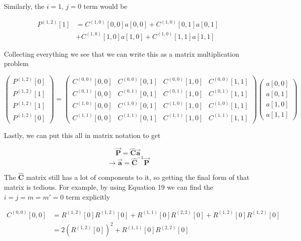 \documentclass{article}
\begin{document}
Similarly, the $i=1,\, j=0$ term would be

\begin{align}
    P^{(1,2)}[1] &= C^{(1,0)}[0,0] a[0,0] + C^{(1,0)}[0,1] a[0,1]\nonumber\\
    &+ C^{(1,0)}[1,0] a[1,0] + C^{(1,0)}[1,1] a[1,1]
\end{align}

Collecting everything we see that we can write this as a matrix multiplication
problem

\begin{equation}
    \begin{pmatrix}
        P^{(1,2)}[0]\\
        P^{(1,2)}[1]\\
        P^{(1,2)}[1]\\
        P^{(1,2)}[0]
    \end{pmatrix}
    =
    \begin{pmatrix}
        C^{(0,0)}[0,0] & C^{(0,0)}[0,1] & C^{(0,0)}[1,0] & C^{(0,0)}[1,1]\\
        C^{(0,1)}[0,0] & C^{(0,1)}[0,1] & C^{(0,1)}[1,0] & C^{(0,1)}[1,1]\\
        C^{(1,0)}[0,0] & C^{(1,0)}[0,1] & C^{(1,0)}[1,0] & C^{(1,0)}[1,1]\\
        C^{(1,1)}[0,0] & C^{(1,1)}[0,1] & C^{(1,1)}[1,0] & C^{(1,1)}[1,1]
    \end{pmatrix}
    \begin{pmatrix}
        a[0,0]\\
        a[0,1]\\
        a[1,0]\\
        a[1,1]
    \end{pmatrix}
\end{equation}

Lastly, we can put this all in matrix notation to get

\begin{equation}
    \vec{\mathbf{P}} = \hat{\mathbf{C}} \vec{\mathbf{a}}\nonumber
\end{equation}
\begin{equation}
    \to \vec{\mathbf{a}} = \hat{\mathbf{C}}^{-1}\vec{\mathbf{P}}
\end{equation}

The $\hat{\mathbf{C}}$ matrix still has a lot of components to it, so getting
the final form of that matrix is tedious. For example, by using Equation 19
we can find the $i=j=m=m'=0$ term explicitly

\begin{align}
    C^{(0,0)}[0,0] &= R^{(1,2)}[0]R^{(1,2)}[0] + R^{(1,1)}[0]R^{(2,2)}[0]
    + R^{(1,2)}[0]R^{(1,2)}[0]\nonumber\\
    & = 2\left(R^{(1,2)}[0]\right)^2 +R^{(1,1)}[0]R^{(2,2)}[0]
\end{align}
\end{document}
